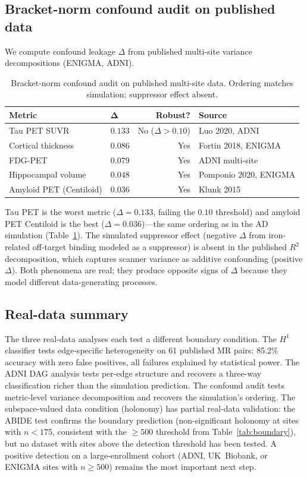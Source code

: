 \documentclass{article}
\begin{document}
\subsection{Bracket-norm confound audit on published data}
\label{sec:realdata-confound}

We compute confound leakage $\Delta$ from published multi-site variance decompositions (ENIGMA, ADNI).

\begin{table}[t]
\centering
\caption{Bracket-norm confound audit on published multi-site data. Ordering matches simulation; suppressor effect absent.}
\label{tab:realdata-confound}
\small
\begin{tabular}{@{}llrl@{}}
\toprule
\textbf{Metric} & $\boldsymbol{\Delta}$ & \textbf{Robust?} & \textbf{Source} \\
\midrule
Tau PET SUVR & $0.133$ & No ($\Delta > 0.10$) & Luo 2020, ADNI \\
Cortical thickness & $0.086$ & Yes & Fortin 2018, ENIGMA \\
FDG-PET & $0.079$ & Yes & ADNI multi-site \\
Hippocampal volume & $0.048$ & Yes & Pomponio 2020, ENIGMA \\
Amyloid PET (Centiloid) & $0.036$ & Yes & Klunk 2015 \\
\bottomrule
\end{tabular}
\end{table}

Tau PET is the worst metric ($\Delta = 0.133$, failing the $0.10$ threshold) and amyloid PET Centiloid is the best ($\Delta = 0.036$)---the same ordering as in the AD simulation (Table~\ref{tab:realdata-confound}). The simulated suppressor effect (negative $\Delta$ from iron-related off-target binding modeled as a suppressor) is absent in the published $R^2$ decomposition, which captures scanner variance as additive confounding (positive $\Delta$). Both phenomena are real; they produce opposite signs of $\Delta$ because they model different data-generating processes.

\subsection{Real-data summary}
\label{sec:realdata-summary}

The three real-data analyses each test a different boundary condition.
The $H^1$ classifier tests edge-specific heterogeneity on 61 published MR pairs: 85.2\% accuracy with zero false positives, all failures explained by statistical power.
The ADNI DAG analysis tests per-edge structure and recovers a three-way classification richer than the simulation prediction.
The confound audit tests metric-level variance decomposition and recovers the simulation's ordering.
The subspace-valued data condition (holonomy) has partial real-data validation: the ABIDE test confirms the boundary prediction (non-significant holonomy at sites with $n < 175$, consistent with the $\geq 500$ threshold from Table~\ref{tab:boundary}), but no dataset with sites above the detection threshold has been tested.
A positive detection on a large-enrollment cohort (ADNI, UK~Biobank, or ENIGMA sites with $n \geq 500$) remains the most important next step.
\end{document}
